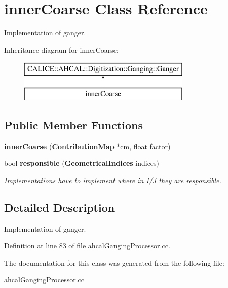 \section{inner\-Coarse Class Reference}
\label{classinnerCoarse}


Implementation of ganger.  


Inheritance diagram for inner\-Coarse\-:\begin{figure}[H]
\begin{center}
\leavevmode
\includegraphics[height=2.000000cm]{classinnerCoarse}
\end{center}
\end{figure}
\subsection*{Public Member Functions}
\begin{DoxyCompactItemize}
\item 
{\bfseries inner\-Coarse} ({\bf Contribution\-Map} $\ast$cm, float factor)\label{classinnerCoarse_a4273c4497fb348c311677291af0940b2}

\item 
bool {\bf responsible} ({\bf Geometrical\-Indices} indices)\label{classinnerCoarse_a35f969c20bf726dacc6a06a1bef2030e}

\begin{DoxyCompactList}\small\item\em Implementations have to implement where in I/\-J they are responsible. \end{DoxyCompactList}\end{DoxyCompactItemize}


\subsection{Detailed Description}
Implementation of ganger. 

Definition at line 83 of file ahcal\-Ganging\-Processor.\-cc.



The documentation for this class was generated from the following file\-:\begin{DoxyCompactItemize}
\item 
ahcal\-Ganging\-Processor.\-cc\end{DoxyCompactItemize}
